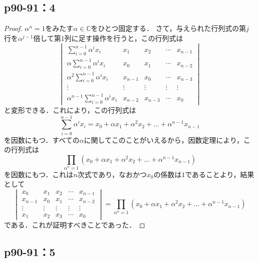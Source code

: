 \documentclass[uplatex,dvipdfmx,a4paper,10pt,fleqn]{jsarticle}
\begin{document}
\newpage 


\subsection*{p90-91：4}

\begin{leftbar}
    \begin{proof}
    $\alpha ^n =1$をみたす$\alpha \in \mathbb{C}$をひとつ固定する．
    さて，与えられた行列式の第$j$行を$\alpha^{j-1}$倍して第$1$列に足す操作を行うと，この行列式は
    \[
        \begin{vmatrix}
            \sum_{i=0}^{n-1} \alpha^i x_i & x_1 & x_2 & \cdots & x_{n-1} \\
            \alpha \sum_{i=0}^{n-1} \alpha^i x_i & x_0 & x_1 & \cdots & x_{n-2} \\
            \alpha^2 \sum_{i=0}^{n-1} \alpha^i x_i & x_{n-1} & x_0 & \cdots & x_{n-3} \\
            \vdots & \vdots & \vdots & \vdots & \vdots  \\
            \alpha^{n-1} \sum_{i=0}^{n-1} \alpha^i x_i & x_{n-2} & x_{n-3} & \cdots & x_0 
        \end{vmatrix}
    \]
    と変形できる．これにより，この行列式は
    \[
        \sum_{i=0}^{n-1} \alpha^i x_i = x_0 + \alpha x_1 + \alpha^2 x_2 + \dots +\alpha^{n-1} x_{n-1}
    \]
    を因数にもつ．すべての$\alpha$に関してこのことがいえるから，因数定理により，この行列式は
    \[
        \prod_{\alpha^n=1} (x_0 + \alpha x_1 + \alpha^2 x_2 + \dots +\alpha^{n-1} x_{n-1})
    \]
を因数にもつ．これは$n$次式であり，なおかつ$x_0$の係数は$1$であることより，結果として
\[
   \begin{vmatrix} 
    x_0 & x_1 & x_2 & \cdots & x_{n-1} \\
    x_{n-1} & x_0 & x_1 & \cdots & x_{n-2} \\
    \vdots & \vdots & \vdots & \vdots & \vdots \\
    x_1 & x_2 & x_3 & \cdots & x_0 
   \end{vmatrix} 
   =  \prod_{\alpha^n=1} (x_0 + \alpha x_1 + \alpha^2 x_2 + \dots +\alpha^{n-1} x_{n-1})
\]
である．これが証明すべきことであった．
\end{proof}
\end{leftbar}


\subsection*{p90-91：5}
\end{document}
